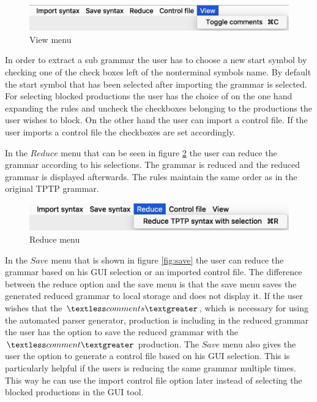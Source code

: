 \begin{figure}[H]
\centering
\includegraphics[width=.7\textwidth]{images/view.png}
\caption{View menu}
\label{fig:view}
\end{figure}

In order to extract a sub grammar the user has to choose a new start symbol by checking one of the check boxes left of the nonterminal symbols name. By default the start symbol that has been selected after importing the grammar is selected. For selecting blocked productions the user has the choice of on the one hand expanding the rules and uncheck the checkboxes belonging to the productions the user wishes to block. On the other hand the user can import a control file. If the user imports a control file the checkboxes are set accordingly.

In the $Reduce$ menu that can be seen in figure \ref{fig:reduce} the user can reduce the grammar according to his selections. The grammar is reduced and the reduced grammar is displayed afterwards. The rules maintain the same order as in the original TPTP grammar.

\begin{figure}[H]
\centering
\includegraphics[width=.7\textwidth]{images/reduce.png}
\caption{Reduce menu}
\label{fig:reduce}
\end{figure}

In the $Save$ menu that is shown in figure \ref{fig:save} the user can reduce the grammar based on his GUI selection or an imported control file. The difference between the reduce option and the save menu is that the save menu saves the generated reduced grammar to local storage and does not display it. If the user wishes that the $\textless comments\textgreater$, which is necessary for using the automated parser generator, production is including in the reduced grammar the user has the option to save the reduced grammar with the $\textless comment\textgreater$ production.
The $Save$ menu also gives the user the option to generate a control file based on his GUI selection. This is particularly helpful if the users is reducing the same grammar multiple times. This way he can use the import control file option later instead of selecting the blocked productions in the GUI tool.

